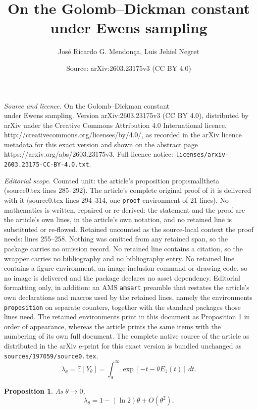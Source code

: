 \documentclass[10pt,a4paper]{amsart}
\title{On the Golomb--Dickman constant \\ under Ewens sampling}
\author{Jos\'e Ricardo G. Mendon\c{c}a, Luis Jehiel Negret}
\date{Source: arXiv:2603.23175v3 (CC BY 4.0)}
\newtheorem{proposition}{Proposition}
\newcommand{\EE}{\mathbb{E}}
\begin{document}
\maketitle

\noindent\emph{Source and licence.} On the Golomb--Dickman constant \\ under Ewens sampling. Version arXiv:2603.23175v3 (CC BY 4.0), distributed by arXiv under the Creative Commons Attribution 4.0 International licence, http://creativecommons.org/licenses/by/4.0/, as recorded in the arXiv licence metadata for this exact version and shown on the abstract page https://arxiv.org/abs/2603.23175v3. Full licence notice: \texttt{licenses/arxiv-2603.23175-CC-BY-4.0.txt}.\par\smallskip

\noindent\textit{Editorial scope.} Counted unit: the article's proposition prop:smalltheta (source0.tex lines 285--292). The article's complete original proof of it is delivered with it (source0.tex lines 294--314, one \texttt{proof} environment of 21 lines). No mathematics is written, repaired or re-derived: the statement and the proof are the article's own lines, in the article's own notation, and no retained line is substituted or re-flowed.  Retained uncounted as the source-local context the proof needs: lines 255--258.  Nothing was omitted from any retained span, so the package carries no omission record.  No retained line contains a citation, so the wrapper carries no bibliography and no bibliography entry.  No retained line contains a figure environment, an image-inclusion command or drawing code, so no image is delivered and the package declares no asset dependency.  Editorial formatting only, in addition: an AMS \texttt{amsart} preamble that restates the article's own declarations and macros used by the retained lines, namely the environments \texttt{proposition} on separate counters, together with the standard packages those lines need.  The retained environments print in this document as Proposition 1 in order of appearance, whereas the article prints the same items with the numbering of its own full document.  The complete native source of the article as distributed in the arXiv e-print for this exact version is bundled unchanged as \texttt{sources/197059/source0.tex}.
\begin{equation}
\label{eq:ggd}
\lambda_{\theta} = \EE[Y_{\theta}] = \int_{0}^{\infty} \exp[-t-\theta E_{1}(t)]\,dt.
\end{equation}

\begin{proposition}
\label{prop:smalltheta}
As $\theta \to 0$,
\begin{equation}
\label{eq:smalltheta}
\lambda_{\theta} = 1 - (\ln{2})\theta + O(\theta^{2}).
\end{equation}
\end{proposition}
\end{document}
